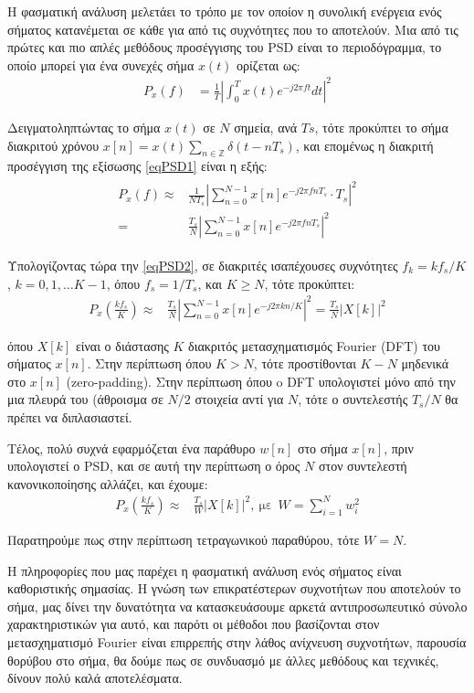 \documentclass[11pt,a4paper,english,greek,twoside]{../Thesis}
\begin{document}
\par Η φασματική ανάλυση μελετάει το τρόπο με τον οποίον η συνολική ενέργεια ενός σήματος κατανέμεται σε κάθε για από τις συχνότητες που το αποτελούν. Μια από τις πρώτες και πιο απλές μεθόδους προσέγγισης του PSD είναι το περιοδόγραμμα, το οποίο μπορεί για ένα συνεχές σήμα $x(t)$ ορίζεται ως:
\begin{align}
P_x(f)&=\frac{1}{T}\left|\int_0^Tx(t)e^{-j2\pi ft}dt\right|^2
\label{eqPSD1}
\end{align}
\par Δειγματοληπτώντας το σήμα $x(t)$ σε $N$ σημεία, ανά $Ts$, τότε προκύπτει το σήμα διακριτού χρόνου $x[n] = x(t)\sum_{n\in\mathbb{Z}} \delta(t-nT_s)$, και επομένως η διακριτή προσέγγιση της εξίσωσης \eqref{eqPSD1} είναι η εξής:
\begin{align}
    \begin{split}
        P_x(f)\approx &\frac{1}{NT_s}\left|\sum_{n=0}^{N-1}x[n]e^{-j2\pi fnT_s}\cdot T_s\right|^2 \\[2ex]
        =&\frac{T_s}{N}\left|\sum_{n=0}^{N-1}x[n]e^{-j2\pi fnT_s}\right|^2
        \label{eqPSD2}
    \end{split}
\end{align}
\par Υπολογίζοντας τώρα την \eqref{eqPSD2}, σε διακριτές ισαπέχουσες συχνότητες $f_k=kf_s/K$, $k=0,1,\ldots K-1$, όπου $f_s=1/T_s$, και $K\ge N$, τότε προκύπτει:
\begin{align}
    P_x\left(\frac{kf_s}{K}\right)\approx &\frac{T_s}{N}\left|\sum_{n=0}^{N-1}x[n]e^{-j2\pi kn/K}\right|^2=\frac{T_s}{N}\left|X[k]\right|^2
    \label{eqPSD3}
\end{align}
\par όπου $X[k]$ είναι ο διάστασης $K$ διακριτός μετασχηματισμός Fourier (DFT) του σήματος $x[n]$. Στην περίπτωση όπου $K>N$, τότε προστίθονται $K-N$ μηδενικά στο $x[n]$ (zero-padding). Στην περίπτωση όπου o DFT υπολογιστεί μόνο από την μια πλευρά του (άθροισμα σε $N/2$ στοιχεία αντί για $N$, τότε ο συντελεστής $T_s/N$ θα πρέπει να διπλασιαστεί. 
\par Τέλος, πολύ συχνά εφαρμόζεται ένα παράθυρο $w[n]$ στο σήμα $x[n]$, πριν υπολογιστεί ο PSD, και σε αυτή την περίπτωση ο όρος $N$ στον συντελεστή κανονικοποίησης αλλάζει, και έχουμε:
\begin{align}
    P_x\left(\frac{kf_s}{K}\right)\approx &\frac{T_s}{W}\left|X[k]\right|^2 , \ \text{με} \ \ W=\sum_{i=1}^{N} w_{i}^{2}
    \label{eqPSD4}
\end{align}
\par Παρατηρούμε πως στην περίπτωση τετραγωνικού παραθύρου, τότε $W=N$.
\par Η πληροφορίες που μας παρέχει η φασματική ανάλυση ενός σήματος είναι καθοριστικής σημασίας. Η γνώση των επικρατέστερων συχνοτήτων που αποτελούν το σήμα, μας δίνει την δυνατότητα να κατασκευάσουμε αρκετά αντιπροσωπευτικό σύνολο χαρακτηριστικών για αυτό, και παρότι οι μέθοδοι που βασίζονται στον μετασχηματισμό Fourier είναι επιρρεπής στην λάθος ανίχνευση συχνοτήτων, παρουσία θορύβου στο σήμα, θα δούμε πως σε συνδυασμό με άλλες μεθόδους και τεχνικές, δίνουν πολύ καλά αποτελέσματα. 
\end{document}
